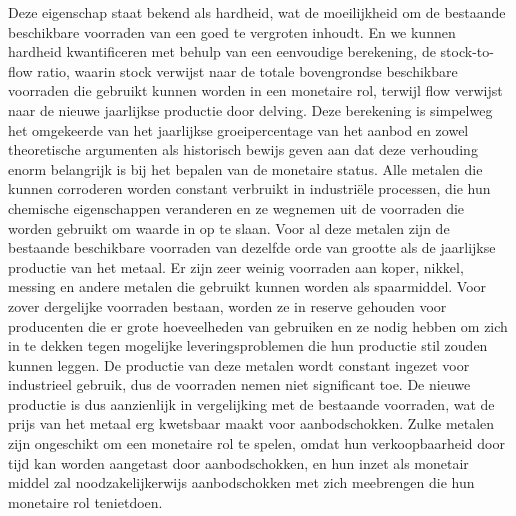 \documentclass[
  a5paper,
  smalldemyvopaper,11pt,twoside,onecolumn,openright,extrafontsizes,
hidelinks]{memoir}
\begin{document}
Deze eigenschap staat bekend als hardheid, wat de moeilijkheid om de
bestaande beschikbare voorraden van een goed te vergroten inhoudt. En we
kunnen hardheid kwantificeren met behulp van een eenvoudige berekening,
de stock-to-flow ratio, waarin stock verwijst naar de totale
bovengrondse beschikbare voorraden die gebruikt kunnen worden in een
monetaire rol, terwijl flow verwijst naar de nieuwe jaarlijkse productie
door delving. Deze berekening is simpelweg het omgekeerde van het
jaarlijkse groeipercentage van het aanbod en zowel theoretische
argumenten als historisch bewijs geven aan dat deze verhouding enorm
belangrijk is bij het bepalen van de monetaire status. Alle metalen die
kunnen corroderen worden constant verbruikt in industriële processen,
die hun chemische eigenschappen veranderen en ze wegnemen uit de
voorraden die worden gebruikt om waarde in op te slaan. Voor al deze
metalen zijn de bestaande beschikbare voorraden van dezelfde orde van
grootte als de jaarlijkse productie van het metaal. Er zijn zeer weinig
voorraden aan koper, nikkel, messing en andere metalen die gebruikt
kunnen worden als spaarmiddel. Voor zover dergelijke voorraden bestaan,
worden ze in reserve gehouden voor producenten die er grote hoeveelheden
van gebruiken en ze nodig hebben om zich in te dekken tegen mogelijke
leveringsproblemen die hun productie stil zouden kunnen leggen. De
productie van deze metalen wordt constant ingezet voor industrieel
gebruik, dus de voorraden nemen niet significant toe. De nieuwe
productie is dus aanzienlijk in vergelijking met de bestaande voorraden,
wat de prijs van het metaal erg kwetsbaar maakt voor aanbodschokken.
Zulke metalen zijn ongeschikt om een monetaire rol te spelen, omdat hun
verkoopbaarheid door tijd kan worden aangetast door aanbodschokken, en
hun inzet als monetair middel zal noodzakelijkerwijs aanbodschokken met
zich meebrengen die hun monetaire rol tenietdoen.
\end{document}
